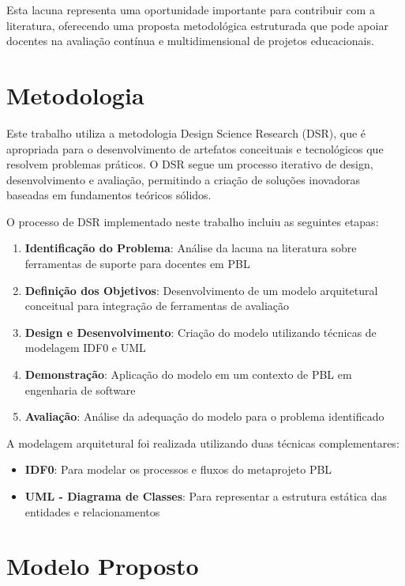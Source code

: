 \documentclass[english, spanish, brazilian]{RBIEarticle} %
\begin{document}
Esta lacuna representa uma oportunidade importante para contribuir com a literatura, oferecendo uma proposta metodológica estruturada que pode apoiar docentes na avaliação contínua e multidimensional de projetos educacionais.

\section{Metodologia}

Este trabalho utiliza a metodologia Design Science Research (DSR), que é apropriada para o desenvolvimento de artefatos conceituais e tecnológicos que resolvem problemas práticos. O DSR segue um processo iterativo de design, desenvolvimento e avaliação, permitindo a criação de soluções inovadoras baseadas em fundamentos teóricos sólidos.

O processo de DSR implementado neste trabalho incluiu as seguintes etapas:

\begin{enumerate}
    \item \textbf{Identificação do Problema}: Análise da lacuna na literatura sobre ferramentas de suporte para docentes em PBL
    \item \textbf{Definição dos Objetivos}: Desenvolvimento de um modelo arquitetural conceitual para integração de ferramentas de avaliação
    \item \textbf{Design e Desenvolvimento}: Criação do modelo utilizando técnicas de modelagem IDF0 e UML
    \item \textbf{Demonstração}: Aplicação do modelo em um contexto de PBL em engenharia de software
    \item \textbf{Avaliação}: Análise da adequação do modelo para o problema identificado
\end{enumerate}

A modelagem arquitetural foi realizada utilizando duas técnicas complementares:

\begin{itemize}
    \item \textbf{IDF0}: Para modelar os processos e fluxos do metaprojeto PBL
    \item \textbf{UML - Diagrama de Classes}: Para representar a estrutura estática das entidades e relacionamentos
\end{itemize}

\section{Modelo Proposto}
\end{document}
